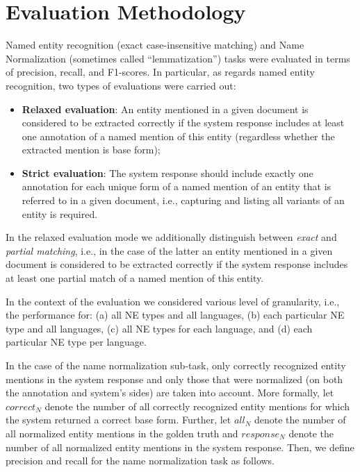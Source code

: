 \documentclass[11pt]{article}
\begin{document}
\begin{table*}[t]
\begin{minipage}{\linewidth}
  \end{minipage}%
\end{table*}



\section{Evaluation Methodology}
\label{sec:evaluation}

Named entity recognition (exact case-insensitive matching) and  Name Normalization (sometimes called “lemmatization”) tasks were evaluated in terms of precision, recall, and F1-scores. In particular, as regards named entity recognition, two types of evaluations were carried out:

\begin{itemize}

\item \textbf{Relaxed evaluation}: An entity mentioned in a given document is considered to be extracted correctly if the system response includes at least one annotation of a named mention of this entity (regardless whether the extracted mention is base form);

\item \textbf{Strict evaluation}: The system response should include exactly one annotation for each unique form of a named mention of an entity that is referred to in a given document, i.e., capturing and listing all variants of an entity is required.

\end{itemize}

\noindent In the relaxed evaluation mode we additionally distinguish between \textit{exact} and \textit{partial matching}, i.e., in the case of the latter an entity mentioned in a given document is considered to be extracted correctly if the system response includes at least one partial match of a named mention of this entity.

In the context of the evaluation we considered various level of granularity, i.e., the performance for: 
(a) all NE types and all languages, (b) each particular NE type and all languages, (c) all NE types for 
each language, and (d) each particular NE type per language. 


In the case of the name normalization sub-task, only correctly recognized entity mentions in the system response and only those that were normalized (on both the annotation and system's sides) are taken into account. More formally, let $correct_{N}$ denote the number of all correctly recognized entity mentions for which the system returned a correct base form. Further, let 
$all_{N}$ denote the number of all normalized entity mentions in the golden truth and $response_{N}$ denote the number of
all normalized entity mentions in the system response. Then, we define precision and recall for the name normalization task 
as follows.
\end{document}

